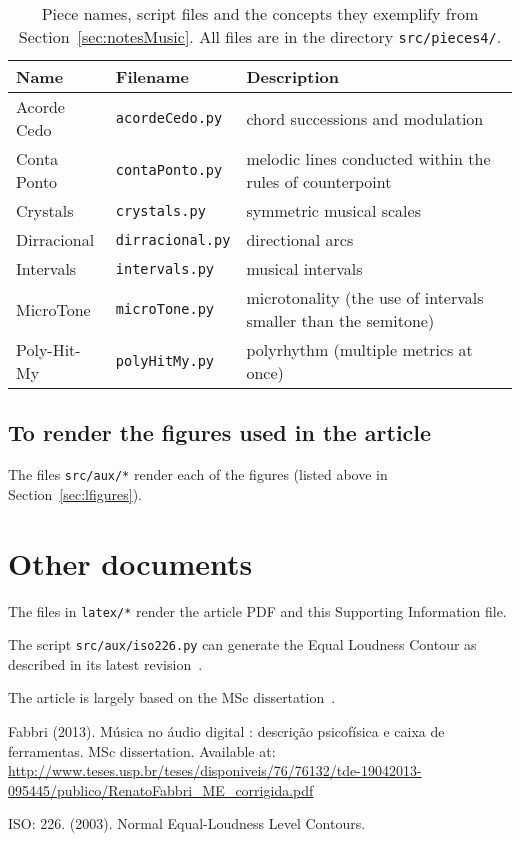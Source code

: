 \documentclass{scrreprt}
\begin{document}
\begin{table*}[htp!]
\centering
\caption{Piece names, script files and the concepts they exemplify from Section~\ref{sec:notesMusic}. All files are in the directory \texttt{src/pieces4/}.}
\begin{tabular}{ p{5cm} | p{3.5cm} | p{6.2cm} }
   Name & Filename & Description \\\hline
 Acorde Cedo & \texttt{acordeCedo.py} & chord successions and modulation \\
 Conta Ponto & \texttt{contaPonto.py} & melodic lines conducted within the rules of counterpoint \\
 Crystals & \texttt{crystals.py} & symmetric musical scales \\
 Dirracional & \texttt{dirracional.py} & directional arcs \\
 Intervals & \texttt{intervals.py} & musical intervals \\
 MicroTone & \texttt{microTone.py} & microtonality (the use of intervals smaller than the semitone) \\
 Poly-Hit-My & \texttt{polyHitMy.py} & polyrhythm (multiple metrics at once) \\
\end{tabular}
\end{table*}

\clearpage
\subsection{To render the figures used in the article}
The files \texttt{src/aux/*} render each of the figures (listed above in Section~\ref{sec:lfigures}).

\clearpage
\section{Other documents}
The files in \texttt{latex/*} render the article PDF and this Supporting Information file.

The script \texttt{src/aux/iso226.py} can generate the Equal Loudness Contour as described in its latest revision~\cite{iso226}.

The article is largely based on the MSc dissertation~\cite{dissertacao}.

% 
\begin{thebibliography}{9}
    Fabbri (2013). M\'usica no \'audio digital : descri\c{c}\~ao psicof\'isica e caixa de ferramentas. MSc dissertation. Available at: \url{http://www.teses.usp.br/teses/disponiveis/76/76132/tde-19042013-095445/publico/RenatoFabbri_ME_corrigida.pdf}

    ISO: 226. (2003). Normal Equal-Loudness Level Contours.
\end{thebibliography}
\end{document}
